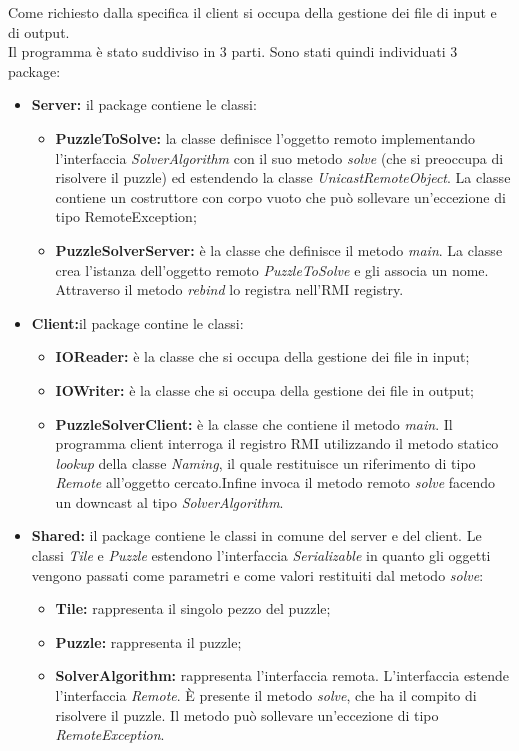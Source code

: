 \documentclass[13pt]{article}
\begin{document}
Come richiesto dalla specifica il client si occupa della gestione dei file di input e di output.\\
\newpage
Il programma è stato suddiviso in 3 parti. Sono stati quindi individuati 3 package:
\begin{itemize}
	\item \textbf{Server: }il package contiene le classi:
		\begin{itemize}
			\item \textbf{PuzzleToSolve:} la classe definisce l'oggetto remoto implementando l'interfaccia \textit{SolverAlgorithm} con il suo metodo \textit{solve} (che si preoccupa di risolvere il puzzle)  ed estendendo la classe \textit{UnicastRemoteObject}. La classe contiene un costruttore con corpo vuoto che può sollevare un'eccezione di tipo RemoteException;
			\item \textbf{PuzzleSolverServer: }è la classe che definisce il metodo \textit{main}. La classe crea l'istanza dell'oggetto remoto \textit{PuzzleToSolve} e gli associa un nome. Attraverso il metodo \textit{rebind} lo registra nell'RMI registry.
		\end{itemize}
	\item \textbf{Client:}il package contine le classi:
		\begin{itemize}
			\item \textbf{IOReader: }è la classe che si occupa della gestione dei file in input;
			\item \textbf{IOWriter: }è la classe che si occupa della gestione dei file in output;
			\item \textbf{PuzzleSolverClient: }è la classe che contiene il metodo \textit{main}. Il programma client interroga il registro RMI utilizzando il metodo statico \textit{lookup} della classe \textit{Naming}, il quale restituisce un riferimento di tipo \textit{Remote} all'oggetto cercato.Infine invoca il metodo remoto \textit{solve} facendo un downcast al tipo \textit{SolverAlgorithm}.
		\end{itemize}
	\item \textbf{Shared:} il package contiene le classi in comune del server e del client. Le classi \textit{Tile} e \textit{Puzzle} estendono l'interfaccia \textit{Serializable} in quanto gli oggetti vengono passati come parametri e come valori restituiti dal metodo \textit{solve}:
		\begin{itemize}
			\item \textbf{Tile:} rappresenta il singolo pezzo del puzzle;
			\item \textbf{Puzzle:} rappresenta il puzzle;
			\item \textbf{SolverAlgorithm:} rappresenta l'interfaccia remota. L'interfaccia estende l'interfaccia \textit{Remote}. È presente il metodo \textit{solve}, che ha il compito di risolvere il puzzle. Il metodo può sollevare un'eccezione di tipo \textit{RemoteException}.
		\end{itemize}
\end{itemize}
\end{document}
